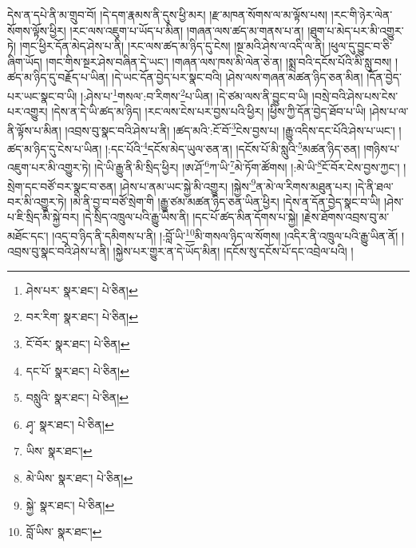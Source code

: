དེས་ན་དཔེ་ནི་མ་གྲུབ་བོ། །དེ་དག་རྣམས་ནི་དུས་ཕྱི་མར། །རྫ་མཁན་སོགས་ལ་མ་ལྟོས་པས། །རང་གི་ཉེར་ལེན་སོགས་ལྟོས་ཕྱིར། །རང་ལས་འཇུག་པ་ཡོད་པ་མིན། །གཞན་ལས་ཚད་མ་གནས་པ་ན། །ཐུག་པ་མེད་པར་མི་འགྱུར་ཏེ། །གང་ཕྱིར་དོན་མེད་ཤེས་པ་ནི། །རང་ལས་ཚད་མ་ཉིད་དུ་ངེས། །སྔ་མའི་ཤེས་ལ་འདི་ལ་ནི། །ཕུལ་དུ་བྱུང་བ་ཅི་ཞིག་ཡོད། །གང་གིས་སྔར་ཤེས་བཞིན་དེ་ཡང་། །གཞན་ལས་ཁས་མི་ལེན་ཅེ་ན། །སྨྲ་བའི་དངོས་པོའི་མི་སླུ་བས། །ཚད་མ་ཉིད་དུ་བརྗོད་པ་ཡིན། །དེ་ཡང་དོན་བྱེད་པར་སྣང་བའི། །ཤེས་ལས་གཞན་མཚན་ཉིད་ཅན་མིན། །དོན་བྱེད་པར་ཡང་སྣང་བ་ཡི། །:ཤེས་པ་\footnote{ཤེས་པར་  སྣར་ཐང་།  པེ་ཅིན། }གསལ་:བ་རིགས་\footnote{བར་རིག་  སྣར་ཐང་།  པེ་ཅིན། }པ་ཡིན། །དེ་ཙམ་ལས་ནི་བྱུང་བ་ཡི། །བསྲེ་བའི་ཤེས་པས་ངེས་པར་འགྱུར། །དེས་ན་དེ་ཡི་ཚད་མ་ཉིད། །རང་ལས་ངེས་པར་བྱས་པའི་ཕྱིར། །ཕྱིས་ཀྱི་དོན་བྱེད་ཐོབ་པ་ཡི། །ཤེས་པ་ལ་ནི་ལྟོས་པ་མིན། །འབྲས་བུ་སྣང་བའི་ཤེས་པ་ནི། །ཚད་མའི་:ངོ་བོ་\footnote{ངོ་བོར་  སྣར་ཐང་།  པེ་ཅིན། }ངེས་བྱས་པ། །རྒྱུ་འདིས་དང་པོའི་ཤེས་པ་ཡང་། །ཚད་མ་ཉིད་དུ་ངེས་པ་ཡིན། །:དང་པོའི་\footnote{དང་པོ་  སྣར་ཐང་།  པེ་ཅིན། }དངོས་མེད་ཡུལ་ཅན་ན། །དངོས་པོ་མི་སླུའི་\footnote{བསླུའི་  སྣར་ཐང་།  པེ་ཅིན། }མཚན་ཉིད་ཅན། །གཉིས་པ་འཇུག་པར་མི་འགྱུར་ཏེ། །དེ་ཡི་རྒྱུ་ནི་མི་སྲིད་ཕྱིར། །ཨ་ཤོ་\footnote{ཤྭ་  སྣར་ཐང་།  པེ་ཅིན། }ཀ་ཡི་\footnote{ཡིས་  སྣར་ཐང་། }མེ་ཏོག་ཚོགས། །:མེ་ཡི་\footnote{མེ་ཡིས་  སྣར་ཐང་།  པེ་ཅིན། }ངོ་བོར་ངེས་བྱས་ཀྱང་། །སྲེག་དང་བཙོ་བར་སྣང་བ་ཅན། །ཤེས་པ་ནམ་ཡང་སྐྱེ་མི་འགྱུར། །སྐྱེས་\footnote{སྐྱེ་  སྣར་ཐང་།  པེ་ཅིན། }ན་མེ་ལ་རིགས་མཐུན་པར། །དེ་ནི་ཐལ་བར་མི་འགྱུར་ཏེ། །མེ་ནི་བྱ་བ་བཙོ་སྲེག་གི །རྒྱུ་ཙམ་མཚན་ཉིད་ཅན་ཡིན་ཕྱིར། །དེས་ན་དོན་བྱེད་སྣང་བ་ཡི། །ཤེས་པ་ཇི་སྲིད་མི་སྐྱེ་བར། །དེ་སྲིད་འཁྲུལ་པའི་རྒྱུ་ཡིས་ནི། །དང་པོ་ཚད་མིན་དོགས་པ་སྐྱེ། །རྗེས་ཐོགས་འབྲས་བུ་མ་མཐོང་དང་། །འདྲ་བ་ཉིད་ནི་དམིགས་པ་ནི། །:བློ་ཡི་\footnote{བློ་ཡིས་  སྣར་ཐང་། }མི་གསལ་ཉིད་ལ་སོགས། །འདིར་ནི་འཁྲུལ་པའི་རྒྱུ་ཡིན་ནོ། །འབྲས་བུ་སྣང་བའི་ཤེས་པ་ནི། །སྐྱེས་པར་གྱུར་ན་དེ་ཡོད་མིན། །དངོས་སུ་དངོས་པོ་དང་འབྲེལ་པའི། །
